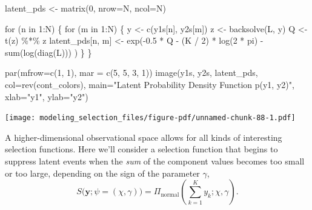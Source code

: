\documentclass[
  letterpaper,
  DIV=11,
  numbers=noendperiod]{scrartcl}
\newenvironment{Shaded}{\begin{snugshade}}{\end{snugshade}}
\newcommand{\AttributeTok}[1]{\textcolor[rgb]{0.40,0.45,0.13}{#1}}
\newcommand{\ControlFlowTok}[1]{\textcolor[rgb]{0.00,0.23,0.31}{#1}}
\newcommand{\DecValTok}[1]{\textcolor[rgb]{0.68,0.00,0.00}{#1}}
\newcommand{\FloatTok}[1]{\textcolor[rgb]{0.68,0.00,0.00}{#1}}
\newcommand{\FunctionTok}[1]{\textcolor[rgb]{0.28,0.35,0.67}{#1}}
\newcommand{\NormalTok}[1]{\textcolor[rgb]{0.00,0.23,0.31}{#1}}
\newcommand{\OtherTok}[1]{\textcolor[rgb]{0.00,0.23,0.31}{#1}}
\newcommand{\SpecialCharTok}[1]{\textcolor[rgb]{0.37,0.37,0.37}{#1}}
\newcommand{\StringTok}[1]{\textcolor[rgb]{0.13,0.47,0.30}{#1}}
\begin{document}
\begin{Shaded}
\begin{Highlighting}[]
\NormalTok{latent\_pds }\OtherTok{\textless{}{-}} \FunctionTok{matrix}\NormalTok{(}\DecValTok{0}\NormalTok{, }\AttributeTok{nrow=}\NormalTok{N, }\AttributeTok{ncol=}\NormalTok{N)}

\ControlFlowTok{for}\NormalTok{ (n }\ControlFlowTok{in} \DecValTok{1}\SpecialCharTok{:}\NormalTok{N) \{}
  \ControlFlowTok{for}\NormalTok{ (m }\ControlFlowTok{in} \DecValTok{1}\SpecialCharTok{:}\NormalTok{N) \{}
\NormalTok{    y }\OtherTok{\textless{}{-}} \FunctionTok{c}\NormalTok{(y1s[n], y2s[m])}
\NormalTok{    z }\OtherTok{\textless{}{-}} \FunctionTok{backsolve}\NormalTok{(L, y)}
\NormalTok{    Q }\OtherTok{\textless{}{-}} \FunctionTok{t}\NormalTok{(z) }\SpecialCharTok{\%*\%}\NormalTok{ z}
\NormalTok{    latent\_pds[n, m] }\OtherTok{\textless{}{-}} \FunctionTok{exp}\NormalTok{(}\SpecialCharTok{{-}}\FloatTok{0.5} \SpecialCharTok{*}\NormalTok{ Q }\SpecialCharTok{{-}}\NormalTok{ (K }\SpecialCharTok{/} \DecValTok{2}\NormalTok{) }\SpecialCharTok{*} \FunctionTok{log}\NormalTok{(}\DecValTok{2} \SpecialCharTok{*}\NormalTok{ pi) }\SpecialCharTok{{-}} \FunctionTok{sum}\NormalTok{(}\FunctionTok{log}\NormalTok{(}\FunctionTok{diag}\NormalTok{(L))) )}
\NormalTok{  \}}
\NormalTok{\}}

\FunctionTok{par}\NormalTok{(}\AttributeTok{mfrow=}\FunctionTok{c}\NormalTok{(}\DecValTok{1}\NormalTok{, }\DecValTok{1}\NormalTok{), }\AttributeTok{mar =} \FunctionTok{c}\NormalTok{(}\DecValTok{5}\NormalTok{, }\DecValTok{5}\NormalTok{, }\DecValTok{3}\NormalTok{, }\DecValTok{1}\NormalTok{))}
\FunctionTok{image}\NormalTok{(y1s, y2s, latent\_pds, }\AttributeTok{col=}\FunctionTok{rev}\NormalTok{(cont\_colors),}
      \AttributeTok{main=}\StringTok{"Latent Probability Density Function p(y1, y2)"}\NormalTok{,}
      \AttributeTok{xlab=}\StringTok{"y1"}\NormalTok{, }\AttributeTok{ylab=}\StringTok{"y2"}\NormalTok{)}
\end{Highlighting}
\end{Shaded}

\texttt{[image: modeling\_selection\_files/figure-pdf/unnamed-chunk-88-1.pdf]}

A higher-dimensional observational space allows for all kinds of
interesting selection functions. Here we'll consider a selection
function that begins to suppress latent events when the \emph{sum} of
the component values becomes too small or too large, depending on the
sign of the parameter \(\gamma\), \[
S\big( \mathbf{y}; \psi = (\chi, \gamma) \big)
=
\Pi_{\text{normal}} \left( \sum_{k = 1}^{K} y_{k}; \chi, \gamma \right).
\]
\end{document}

